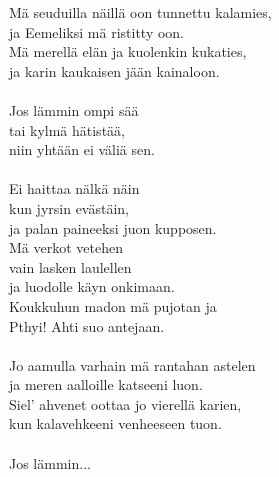 
Mä seuduilla näillä oon tunnettu kalamies, \\ ja Eemeliksi mä ristitty oon. \\ Mä merellä elän ja kuolenkin kukaties, \\ ja karin kaukaisen jään kainaloon. \\ \hspace{10mm} \\ Jos lämmin ompi sää \\ tai kylmä hätistää, \\ niin yhtään ei väliä sen. \\ \hspace{10mm} \\ Ei haittaa nälkä näin \\ kun jyrsin evästäin, \\ ja palan paineeksi juon kupposen. \\ Mä verkot vetehen \\ vain lasken laulellen \\ ja luodolle käyn onkimaan. \\ Koukkuhun madon mä pujotan ja \\ Pthyi! Ahti suo antejaan. \\ \hspace{10mm} \\ Jo aamulla varhain mä rantahan astelen \\ ja meren aalloille katseeni luon. \\ Siel' ahvenet oottaa jo vierellä karien, \\ kun kalavehkeeni venheeseen tuon. \\ \hspace{10mm} \\ Jos lämmin...